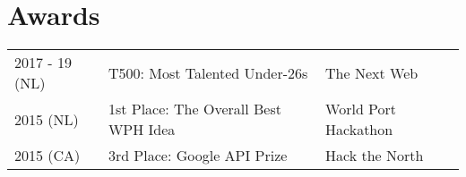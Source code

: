 \documentclass[]{deedy-resume-openfont}
\begin{document}
\begin{minipage}[t]{0.66\textwidth}
\vspace{0.3\topsep}
\href{https://leonoverweel.com/tags/ml-numpy/}{} \textbullet \
\href{https://leonoverweel.com/tags/ml-matplotlib/}{} \textbullet \
\href{https://leonoverweel.com/tags/ml-pytorch/}{} \textbullet \
\href{https://leonoverweel.com/tags/ml-plotly/}{} \textbullet \
\href{https://leonoverweel.com/tags/ml-scipy/}{}

\vspace{0.3\topsep}
\custombold{ML Models:}
\href{https://leonoverweel.com/tags/model-convolutional-neural-network/}{} \textbullet \
\href{https://leonoverweel.com/tags/model-deep-q-network/}{} \textbullet \
\href{https://leonoverweel.com/tags/model-long-short-term-memory/}{}
\vspace{0.3\topsep}



\section{Awards} 
\hspace{-0.3cm}
\begin{tabular}{lll}
2017 - 19 (NL)   & T500: Most Talented Under-26s  & The Next Web\\
2015 (NL)   & 1st Place: The Overall Best WPH Idea      & World Port Hackathon\\
2015 (CA)   & 3rd Place: Google API Prize               & Hack the North\\
\end{tabular}
\vspace{0.1\topsep}

\end{minipage} 
\end{document}

